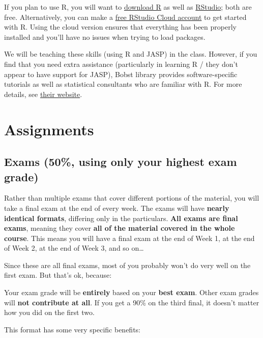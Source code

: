 \documentclass[
]{book}
\begin{document}
If you plan to use R, you will want to \href{https://cran.r-project.org/}{download R} as well as \href{https://www.rstudio.com/products/rstudio/download/}{RStudio}; both are free. Alternatively, you can make a \href{https://www.rstudio.com/products/cloud/}{free RStudio Cloud account} to get started with R. Using the cloud version ensures that everything has been properly installed and you'll have no issues when trying to load packages.

We will be teaching these skills (using R and JASP) in the class. However, if you find that you need extra assistance (particularly in learning R / they don't appear to have support for JASP), Bobst library provides software-specific tutorials as well as statistical consultants who are familiar with R. For more details, see \href{https://guides.nyu.edu/c.php?g=277138\&p=1847146}{their website}.

\hypertarget{assignments}{%
\section{Assignments}\label{assignments}}

\hypertarget{exams-50-using-only-your-highest-exam-grade}{%
\subsection{Exams (50\%, using only your highest exam grade)}\label{exams-50-using-only-your-highest-exam-grade}}

Rather than multiple exams that cover different portions of the material, you will take a final exam at the end of every week. The exams will have \textbf{nearly identical formats}, differing only in the particulars. \textbf{All exams are final exams}, meaning they cover \textbf{all of the material covered in the whole course}. This means you will have a final exam at the end of Week 1, at the end of Week 2, at the end of Week 3, and so on\ldots{}

Since these are all final exams, most of you probably won't do very well on the first exam. But that's ok, because:

Your exam grade will be \textbf{entirely} based on your \textbf{best exam}. Other exam grades will \textbf{not contribute at all}. If you get a 90\% on the third final, it doesn't matter how you did on the first two.

This format has some very specific benefits:
\end{document}
